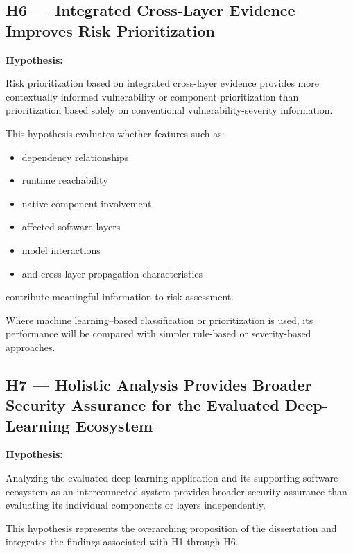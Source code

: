 \documentclass[
  12pt,
  letterpaper,
  oneside]{report}
\providecommand{\tightlist}{%
  \setlength{\itemsep}{0pt}\setlength{\parskip}{0pt}}
\begin{document}
\subsection{H6 --- Integrated Cross-Layer Evidence Improves Risk
Prioritization}\label{h6--integrated-cross-layer-evidence-improves-risk-prioritization}

\textbf{Hypothesis:}

Risk prioritization based on integrated cross-layer evidence provides
more contextually informed vulnerability or component prioritization
than prioritization based solely on conventional vulnerability-severity
information.

This hypothesis evaluates whether features such as:

\begin{itemize}
\tightlist
\item
  dependency relationships
\item
  runtime reachability
\item
  native-component involvement
\item
  affected software layers
\item
  model interactions
\item
  and cross-layer propagation characteristics
\end{itemize}

contribute meaningful information to risk assessment.

Where machine learning--based classification or prioritization is used,
its performance will be compared with simpler rule-based or
severity-based approaches.

\subsection{H7 --- Holistic Analysis Provides Broader Security Assurance
for the Evaluated Deep-Learning
Ecosystem}\label{h7--holistic-analysis-provides-broader-security-assurance-for-the-evaluated-deep-learning-ecosystem}

\textbf{Hypothesis:}

Analyzing the evaluated deep-learning application and its supporting
software ecosystem as an interconnected system provides broader security
assurance than evaluating its individual components or layers
independently.

This hypothesis represents the overarching proposition of the
dissertation and integrates the findings associated with H1 through H6.
\end{document}
